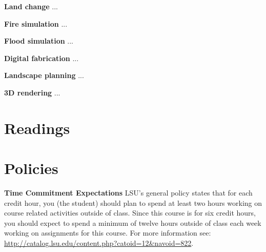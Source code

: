 \documentclass[11pt,article,oneside]{memoir}
\begin{document}
\noindent \textbf{Land change}
... 
%
\nocite{*} \printbibliography[keyword=futures, heading=none]
\vspace*{0.5em}



\noindent \textbf{Fire simulation}
... 
%
\nocite{*} \printbibliography[keyword=fire, heading=none]
\vspace*{0.5em}

\noindent \textbf{Flood simulation}
... 
%
\nocite{*} \printbibliography[keyword=flooding, heading=none]
\vspace*{0.5em}

\noindent \textbf{Digital fabrication}
... 
%
\nocite{*} \printbibliography[keyword=fabrication, heading=none]
\vspace*{0.5em}

\noindent \textbf{Landscape planning}
... 
%
\nocite{*} \printbibliography[keyword=planning, heading=none]
\vspace*{0.5em}

\noindent \textbf{3D rendering}
... %
%
\nocite{*} \printbibliography[keyword=viz, heading=none]
\vspace*{0.5em}

\clearpage

\section{Readings}
\renewcommand*{\bibfont}{\normalsize} %
\vspace*{0.5cm}
\nocite{*}
\setlength{}
\printbibliography[heading=none]

\clearpage

\section{Policies}

\noindent \textbf{Time Commitment Expectations}
LSU's general policy states that for each credit hour, you (the student) should plan to
spend at least two hours working on course related activities outside of class. Since this course is for six credit hours, you should expect to spend a minimum of twelve hours outside of class each week working on assignments for this course. For more information see: 
\url{http://catalog.lsu.edu/content.php?catoid=12&navoid=822}.\\
\end{document}
